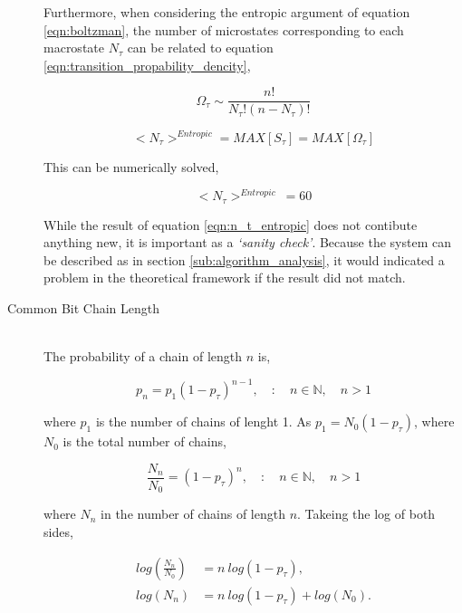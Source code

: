 \begin{description}
					Furthermore, when considering the entropic argument of equation \ref{eqn:boltzman}, the number of microstates corresponding to each macrostate $N_\tau$ can be related to equation \ref{eqn:transition_propability_dencity},

					\begin{equation}
						\Omega_\tau \sim \frac{n!}{N_{\tau}!(n-N_{\tau})!}
					\end{equation}

					\begin{equation}
						<N_\tau>^{Entropic} = MAX[S_\tau] = MAX[\Omega_\tau]
					\end{equation}

					This can be numerically solved,

					\begin{equation}
						<N_\tau>^{Entropic}\ = 60
						\label{eqn:n_t_entropic}
					\end{equation}

					While the result of equation \ref{eqn:n_t_entropic} does not contibute anything new, it is important as a \textit{`sanity check'}.
					Because the system can be described as in section \ref{sub:algorithm_analysis}, it would indicated a problem in the theoretical framework if the result did not match.


				\item[Common Bit Chain Length] \hfill \\
					
					The probability of a chain of length $n$ is,

					\begin{equation}
						p_n = p_1(1 - p_\tau)^{n-1}, \quad : \quad n \in \mathbb{N}, \quad n > 1
					\end{equation}

					where $p_1$ is the number of chains of lenght 1. 
					As $p_1 = N_0 (1 -p_\tau)$, where $N_0$ is the total number of chains,

					\begin{equation}
						\frac{N_n}{N_0} = (1 - p_\tau)^n, \quad : \quad n \in \mathbb{N}, \quad n > 1
					\end{equation}

					where $N_n$ in the number of chains of length $n$.
					Takeing the log of both sides,

					\begin{align}
						log\left(\frac{N_n}{N_0}\right) &= n\ log(1 - p_\tau), \nonumber \\
 						log(N_n) &= n\  log(1 - p_\tau) + log(N_0).
 					\end{align}


\end{description}
